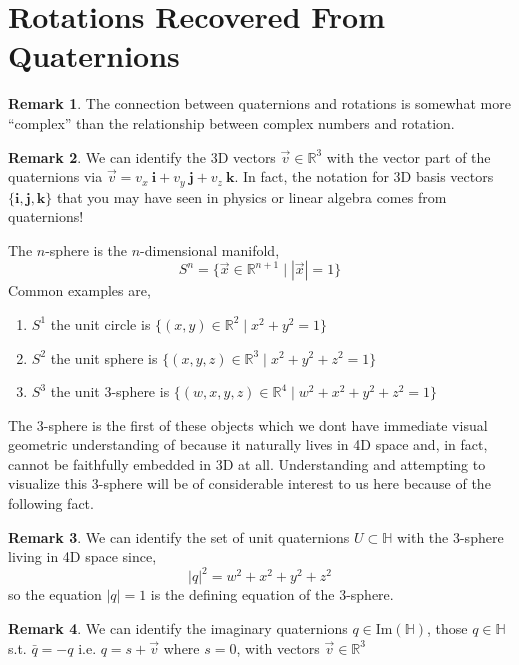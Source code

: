 \documentclass[12pt]{extarticle}
\newcommand{\R}{\mathbb{R}}
\renewcommand{\Im}[1]{\mathrm{Im}(#1)}
\theoremstyle{definition}
\newtheorem{remark}{Remark}
\newenvironment{definition}[1][Definition:]{\begin{trivlist}
\item[\hskip \labelsep {\bfseries #1}]}{\end{trivlist}}
\renewcommand{\bf}[1]{\mathbf{#1}}
\renewcommand{\H}{\mathbb{H}}
\begin{document}
\section{Rotations Recovered From Quaternions}


\begin{remark}
The connection between quaternions and rotations is somewhat more ``complex'' than the relationship between complex numbers and rotation.
\end{remark}

\begin{remark}
We can identify the 3D vectors $\vec{v} \in \R^3$ with the vector part of the quaternions via $\vec{v} = v_x \: \bf{i} + v_y \: \bf{j} + v_z \: \bf{k}$. In fact, the notation for 3D basis vectors $\{ \bf{i}, \bf{j}, \bf{k} \}$ that you may have seen in physics or linear algebra comes from quaternions!
\end{remark}

\begin{definition}
The $n$-sphere is the $n$-dimensional manifold,
\[ S^n = \{ \vec{x} \in \R^{n+1} \mid |\vec{x}| = 1 \} \]
Common examples are,
\begin{enumerate}
\item $S^1$ the unit circle is $\{ (x,y) \in \R^2 \mid x^2 + y^2 = 1 \}$
\item $S^2$ the unit sphere is $\{ (x, y, z) \in \R^3 \mid x^2 + y^2 + z^2 = 1 \}$
\item $S^3$ the unit 3-sphere is $\{ (w, x, y, z) \in \R^4 \mid w^2 + x^2 + y^2 + z^2 = 1 \}$
\end{enumerate}
The 3-sphere is the first of these objects which we dont have immediate visual geometric understanding of because it naturally lives in 4D space and, in fact, cannot be faithfully embedded in 3D at all. Understanding and attempting to visualize this 3-sphere will be of considerable interest to us here because of the following fact.
\end{definition}

\begin{remark}
We can identify the set of unit quaternions $U \subset \H$ with the 3-sphere living in 4D space since,
\[ |q|^2 = w^2 + x^2 + y^2 + z^2 \]
so the equation $|q| = 1$ is the defining equation of the 3-sphere. 
\end{remark}

\begin{remark}
We can identify the imaginary quaternions $q \in \Im{\H}$, those $q \in \H$ s.t. $\bar{q} = -q$ i.e. $q = s + \vec{v}$ where $s = 0$, with vectors $\vec{v} \in \R^3$ 
\end{remark}
\end{document}
